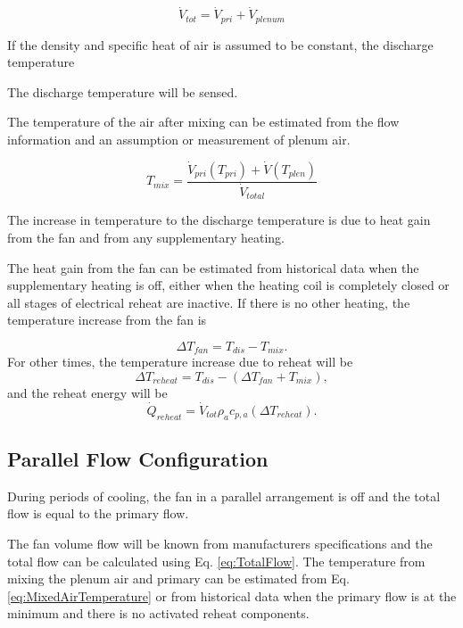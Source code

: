 \begin{equation} \label{eq:TotalFlow}
{\dot V_{tot}} = {\dot V_{pri}} + {\dot V_{plenum}}
\end{equation}

If the density and specific heat of air is assumed to be constant, the discharge temperature 

The discharge temperature will be sensed. 

The temperature of the air after mixing can be estimated from the flow information and an assumption or measurement of plenum air. 


\begin{equation} \label{eq:MixedAirTemperature}
{T_{mix}} = \frac{{{{\dot V}_{pri}}\left( {{T_{pri}}} \right) + \dot V\left( {{T_{plen}}} \right)}}{{{{\dot V}_{total}}}}
\end{equation}




The increase in temperature to the discharge temperature is due to heat gain from the fan and from any supplementary heating.

The heat gain from the fan can be estimated from historical data when the supplementary heating is off, either when the heating coil is completely closed or all stages of electrical reheat are inactive. If there is no other heating, the temperature increase from the fan is

\begin{equation}
\Delta {T_{fan}} = {T_{dis}} - {T_{mix}}.
\end{equation}
%
For other times, the temperature increase due to reheat will be
%
\begin{equation}
\Delta {T_{reheat}} = {T_{dis}} - \left( {\Delta {T_{fan}} + {T_{mix}}} \right),
\end{equation}
%
and the reheat energy will be
%
\begin{equation}
{\dot Q_{reheat}} = {\dot V_{tot}}{\rho _a}{c_{p,a}}\left( {\Delta {T_{reheat}}} \right).
\end{equation}

\subsection{Parallel Flow Configuration}

During periods of cooling, the fan in a parallel arrangement is off and the total flow is equal to the primary flow.

The fan volume flow will be known from manufacturers specifications and the total flow can be calculated using Eq. \eqref{eq:TotalFlow}. The temperature from mixing the plenum air and primary can be estimated from Eq. \eqref{eq:MixedAirTemperature} or from historical data when the primary flow is at the minimum and there is no activated reheat components.

